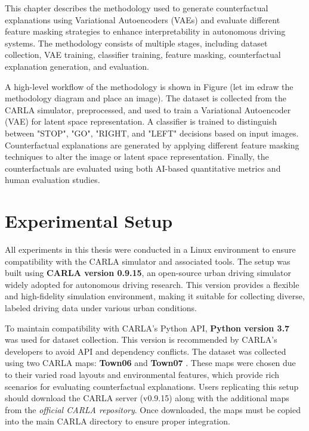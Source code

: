This chapter describes the methodology used to generate counterfactual explanations using Variational Autoencoders (VAEs) and evaluate different feature masking strategies to enhance interpretability in autonomous driving systems. The methodology consists of multiple stages, including dataset collection, VAE training, classifier training, feature masking, counterfactual explanation generation, and evaluation.

A high-level workflow of the methodology is shown in Figure (let im edraw the methodology diagram and place an image). The dataset is collected from the CARLA simulator, preprocessed, and used to train a Variational Autoencoder (VAE) for latent space representation. A classifier is trained to distinguish between "STOP", "GO", "RIGHT, and "LEFT" decisions based on input images. Counterfactual explanations are generated by applying different feature masking techniques to alter the image or latent space representation. Finally, the counterfactuals are evaluated using both AI-based quantitative metrics and human evaluation studies.

\section{Experimental Setup}

All experiments in this thesis were conducted in a Linux environment to ensure compatibility with the CARLA simulator and associated tools. The setup was built using \textbf{CARLA version 0.9.15}, an open-source urban driving simulator widely adopted for autonomous driving research. This version provides a flexible and high-fidelity simulation environment, making it suitable for collecting diverse, labeled driving data under various urban conditions.

To maintain compatibility with CARLA’s Python API, \textbf{Python version 3.7} was used for dataset collection. This version is recommended by CARLA’s developers to avoid API and dependency conflicts. The dataset was collected using two CARLA maps: \textbf{Town06} and \textbf{Town07} \cite{CARLA2024}. These maps were chosen due to their varied road layouts and environmental features, which provide rich scenarios for evaluating counterfactual explanations. Users replicating this setup should download the CARLA server (v0.9.15) along with the additional maps from the \textit{official CARLA repository}. Once downloaded, the maps must be copied into the main CARLA directory to ensure proper integration.

